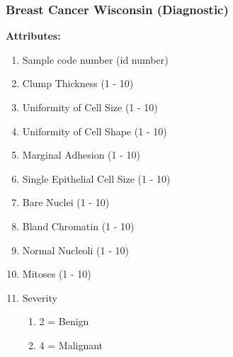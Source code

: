 \documentclass[a4paper,12pt, oneside]{memoir}
\begin{document}
\begin{figure}[h]
  \centering
  \begin{minipage}[h]{0.4\textwidth}
    \subsubsection{Breast Cancer Wisconsin (Diagnostic)}
    \textbf{Attributes:}
      \begin{enumerate}
        \setlength\itemsep{0.001em}
        \item Sample code number (id number)
        \item Clump Thickness (1 - 10)
        \item Uniformity of Cell Size (1 - 10) 
        \item Uniformity of Cell Shape (1 - 10) 
        \item Marginal Adhesion (1 - 10) 
        \item Single Epithelial Cell Size (1 - 10) 
        \item Bare Nuclei  (1 - 10) 
        \item Bland Chromatin (1 - 10) 
        \item Normal Nucleoli (1 - 10) 
        \item Mitoses (1 - 10)
        \item Severity
          \begin{enumerate}
            \item 2 = Benign
            \item 4 = Malignant
          \end{enumerate}
      \end{enumerate}


\end{minipage}
\end{figure}
\end{document}
